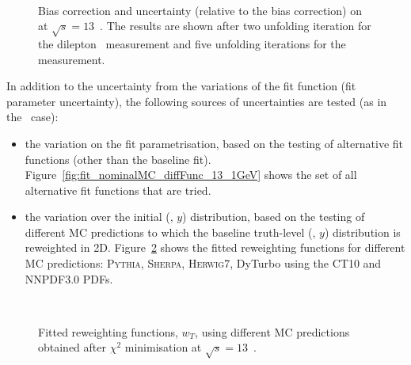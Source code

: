 \begin{figure}[h]
\centering
{}
\\
\caption{Bias correction and uncertainty (relative to the bias correction) on \ptz at $\sqrt{s} = 13$~\TeV. The results are shown after two unfolding iteration for the dilepton \pt\ measurement and five unfolding iterations for the \ut measurement. }
\label{fig:biasunc_13}
\end{figure}

In addition to the uncertainty from the variations of the fit function (fit parameter uncertainty), the following sources of uncertainties are tested (as in the \Wboson\ case):
\begin{itemize}
\item the variation on the fit parametrisation, based on the testing of alternative fit functions (other than the baseline fit). Figure~\ref{fig:fit_nominalMC_diffFunc_13_1GeV} shows the set of all alternative fit functions that are tried.
\item the variation over the initial (\ptz, $y$) distribution, based on the testing of different MC predictions to which the baseline truth-level (\ptz, $y$) distribution is reweighted in 2D. Figure~\ref{fig:fit_nominalMC_diffMC_13_1GeV} shows the fitted reweighting functions for different MC predictions: \textsc{Pythia}, \textsc{Sherpa}, \textsc{Herwig7}, DyTurbo using the CT10 and NNPDF3.0 PDFs.
\end{itemize}

\begin{figure}[h]
\centering
{}
\\
\caption{Fitted reweighting functions, $w_{T}$, using different MC predictions obtained after $\chi^2$ minimisation at $\sqrt{s} = 13$~\TeV.}
\label{fig:fit_nominalMC_diffMC_13_1GeV}
\end{figure}

